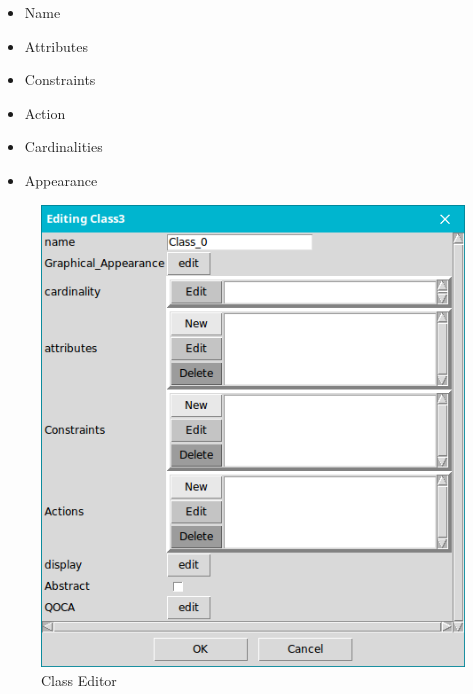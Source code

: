 
\begin{minipage}{0.5\textwidth}
\begin{itemize}
\newcommand{\localtextbulletone}{\textcolor{gray}{\raisebox{.45ex}{\rule{.6ex}{.6ex}}}}
\renewcommand{\labelitemi}{\localtextbulletone}
\item  Name
\item  Attributes
\item  Constraints
\item  Action
\item  Cardinalities
\item  Appearance
\end{itemize}

\end{minipage} \hfill
\begin{minipage}{0.45\textwidth}
\begin{figure}[th]
	\centering
		\includegraphics[scale=0.4]{ch3/img/class}
	\caption{\label{fig:Class Editor}Class Editor}
\end{figure} 

\end{minipage}